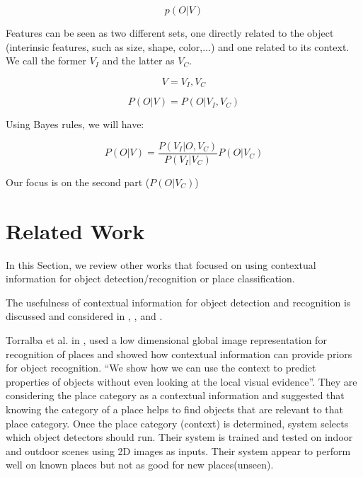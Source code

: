\begin{equation}
 \label{ObjectDetction.eq}
    p(O|V)
\end{equation}

Features can be seen as two different sets, one directly related to the object (interinsic features, such as size, shape, color,...) and one related to its context. We call the former $V_I$ and the latter as $V_C$.

\begin{equation}
 \label{FeaturesSet.eq}
    V = {V_I,V_C}
\end{equation}

\begin{equation}
 \label{ObjectDetctionExtended.eq}
    P(O|V) = P(O|V_I,V_C)
\end{equation}

Using Bayes rules, we will have:

\begin{equation}
 \label{ObjectDetctionBayesapplied.eq}
    P(O|V) = \frac{P(V_I|O,V_C)}{P(V_I|V_C)} P(O|V_C)
\end{equation}

Our focus is on the second part ($P(O|V_C)$)


\section {Related Work}
\label{RelatedWork.sec}
     In this Section, we review other works that focused on using contextual information for object detection/recognition 
     or place classification.
     
The usefulness of contextual information for object detection and recognition is discussed and
considered in \cite{TrollbaContexBased}, \cite{TorralbaContextualPriming}, \cite{PerkoLeonardisContextDriven}
and \cite{aydemir2012_3Dcontext}.

Torralba et al. in \cite{TrollbaContexBased}, used a low dimensional global image 
     representation for recognition of places and showed how contextual information can provide priors for object recognition. ``We show how we can use the context to predict properties of objects without even looking at the local visual evidence''. They are considering the place category as a contextual information and suggested that knowing the category of a place helps to find objects that are relevant to that place category. Once the place category (context) is determined, system selects which object detectors should run. Their system is trained and tested on indoor and outdoor scenes using 2D images as inputs. Their system appear to perform well on known places but not as good for new places(unseen).
%      
     
